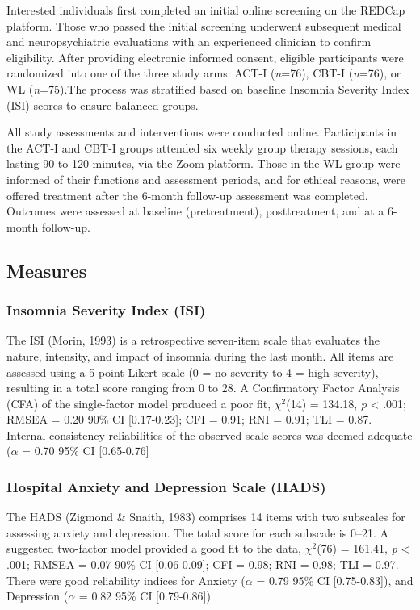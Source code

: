 \documentclass[
  english,
  man]{apa6}
\begin{document}
Interested individuals first completed an initial online screening on the REDCap platform. Those who passed the initial screening underwent subsequent medical and neuropsychiatric evaluations with an experienced clinician to confirm eligibility. After providing electronic informed consent, eligible participants were randomized into one of the three study arms: ACT-I (\emph{n}=76), CBT-I (\emph{n}=76), or WL (\emph{n}=75).The process was stratified based on baseline Insomnia Severity Index (ISI) scores to ensure balanced groups.

All study assessments and interventions were conducted online. Participants in the ACT-I and CBT-I groups attended six weekly group therapy sessions, each lasting 90 to 120 minutes, via the Zoom platform. Those in the WL group were informed of their functions and assessment periods, and for ethical reasons, were offered treatment after the 6-month follow-up assessment was completed. Outcomes were assessed at baseline (pretreatment), posttreatment, and at a 6-month follow-up.

\subsection{Measures}\label{measures}

\subsubsection{Insomnia Severity Index (ISI)}\label{insomnia-severity-index-isi}

The ISI (Morin, 1993) is a retrospective seven-item scale that evaluates the nature, intensity, and impact of insomnia during the last month. All items are assessed using a 5-point Likert scale (0 = no severity to 4 = high severity), resulting in a total score ranging from 0 to 28. A Confirmatory Factor Analysis (CFA) of the single-factor model produced a poor fit, \(\chi^2\)(14) = 134.18, \emph{p} \textless{} .001; RMSEA = 0.20 90\% CI {[}0.17-0.23{]}; CFI = 0.91; RNI = 0.91; TLI = 0.87. Internal consistency reliabilities of the observed scale scores was deemed adequate (\(\alpha\) = 0.70 95\% CI {[}0.65-0.76{]}

\subsubsection{Hospital Anxiety and Depression Scale (HADS)}\label{hospital-anxiety-and-depression-scale-hads}

The HADS (Zigmond \& Snaith, 1983) comprises 14 items with two subscales for assessing anxiety and depression. The total score for each subscale is 0--21. A suggested two-factor model provided a good fit to the data, \(\chi^2\)(76) = 161.41, \emph{p} \textless{} .001; RMSEA = 0.07 90\% CI {[}0.06-0.09{]}; CFI = 0.98; RNI = 0.98; TLI = 0.97. There were good reliability indices for Anxiety (\(\alpha\) = 0.79 95\% CI {[}0.75-0.83{]}), and Depression (\(\alpha\) = 0.82 95\% CI {[}0.79-0.86{]})
\end{document}
